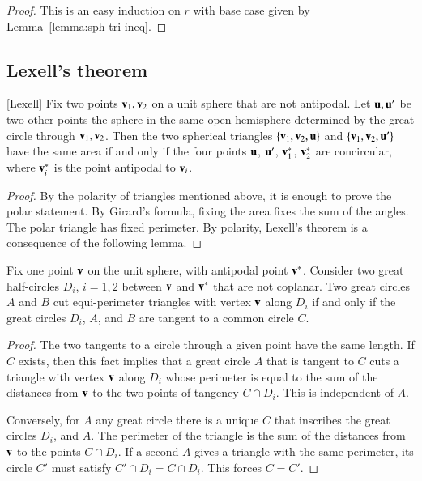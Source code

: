 \begin{proof} This is an easy induction on $r$ with base
case given by Lemma~\ref{lemma:sph-tri-ineq}.
\end{proof}

\subsection{Lexell's theorem}

\begin{lemma}[Lexell]
Fix two points ${\mathbf v}_1,{\mathbf v}_2$ on a unit sphere  that
are not antipodal.
Let ${\mathbf u},{\mathbf u}'$ be two other points the sphere in the same open hemisphere determined by the great circle through ${\mathbf v}_1,{\mathbf v}_2$.  Then the two spherical triangles $\{{\mathbf v}_1,{\mathbf v}_2,{\mathbf u}\}$ and $\{{\mathbf v}_1,{\mathbf v}_2,{\mathbf u}'\}$ have the same area if and only if
the four points ${\mathbf u}$, ${\mathbf u}'$, ${\mathbf v}^*_1$, ${\mathbf v}^*_2$ are concircular, where ${\mathbf v}^*_i$ is the point antipodal to ${\mathbf v}_i$.
\end{lemma}
%
%



\begin{proof}  By the polarity of triangles mentioned above, it is enough to prove the polar statement.  By Girard's formula, fixing the area fixes the sum of the angles.  The polar triangle has fixed perimeter.  By polarity, Lexell's theorem is a consequence of the following lemma.
\end{proof}
%

\begin{lemma}  Fix one point ${\mathbf v}$ on the unit sphere, with antipodal point ${\mathbf v}^*$.  Consider two great half-circles $D_i$, $i=1,2$ between ${\mathbf v}$ and ${\mathbf v}^*$ that are not coplanar.  Two great circles $A$ and $B$ cut equi-perimeter triangles with vertex ${\mathbf v}$ along $D_i$ if and only if the great circles $D_i$, $A$, and $B$ are tangent to a common circle $C$.
\end{lemma}
%

\begin{proof} The two tangents to a circle through a given point have the same length.  If $C$ exists, then this fact implies that a great circle $A$ that is tangent to $C$ cuts a triangle with vertex ${\mathbf v}$ along $D_i$ whose perimeter is equal to the sum of the distances from ${\mathbf v}$ to the two points of tangency $C\cap D_i$.  This is independent of $A$.
%
%
%

Conversely, for $A$ any great circle there is a unique $C$ that inscribes the great circles $D_i$, and $A$.  The perimeter of the triangle is the sum of the distances from ${\mathbf v}$ to the points $C\cap D_i$.
If a second $A$ gives a triangle with the same perimeter, its circle $C'$
must satisfy $C'\cap D_i = C\cap D_i$.  This forces $C=C'$.
\end{proof}

